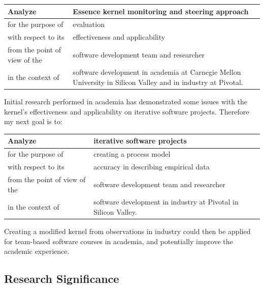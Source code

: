 \documentclass[preprint,12pt,3p]{elsarticle}
\begin{document}
\begin{table}[H]
\centering
\begin{tabular}{|p{2.00in}|p{4.10in}|}
\hline
Analyze & Essence kernel monitoring and steering approach \\ \hline
for the purpose of & evaluation \\ \hline
with respect to its & effectiveness and applicability \\ \hline
from the point of view of the & software development team and researcher \\ \hline
in the context of & software development in academia at Carnegie Mellon University in Silicon Valley and in industry at Pivotal. \\
\hline
\end{tabular}
\end{table}

Initial research performed in academia has demonstrated some issues with the kernel's effectiveness and applicability on iterative software projects. Therefore my next goal is to:

\begin{table}[H]
\centering
\begin{tabular}{|p{2.00in}|p{4.10in}|}
\hline
Analyze & iterative software projects  \\ \hline
for the purpose of & creating a process model  \\ \hline
with respect to its & accuracy in describing empirical data \\ \hline
from the point of view of the & software development team and researcher \\ \hline
in the context of & software development in industry at Pivotal in Silicon Valley. \\
\hline
\end{tabular}
\end{table}

Creating a modified kernel from observations in industry could then be applied for team-based software courses in academia, and potentially improve the academic experience.

\subsection{Research Significance}
\end{document}
